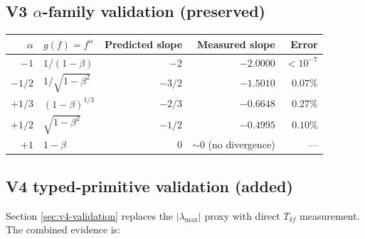 \documentclass[11pt,a4paper]{article}
\begin{document}
\subsection{V3 $\alpha$-family validation (preserved)}

\begin{center}
\begin{tabular}{rlrrr}
\toprule
$\alpha$ & $g(f) = f^\alpha$ & Predicted slope & Measured slope & Error\\
\midrule
$-1$ & $1/(1-\beta)$ & $-2$ & $-2.0000$ & $<10^{-7}$\\
$-1/2$ & $1/\sqrt{1-\beta^2}$ & $-3/2$ & $-1.5010$ & $0.07\%$\\
$+1/3$ & $(1-\beta)^{1/3}$ & $-2/3$ & $-0.6648$ & $0.27\%$\\
$+1/2$ & $\sqrt{1-\beta^2}$ & $-1/2$ & $-0.4995$ & $0.10\%$\\
$+1$ & $1-\beta$ & $0$ & $\sim 0$ (no divergence) & ---\\
\bottomrule
\end{tabular}
\end{center}

\subsection{V4 typed-primitive validation (added)}

Section \ref{sec:v4-validation} replaces the $|\lambda_{\max}|$ proxy with direct $T_{\delta f}$ measurement. The combined evidence is:
\end{document}
